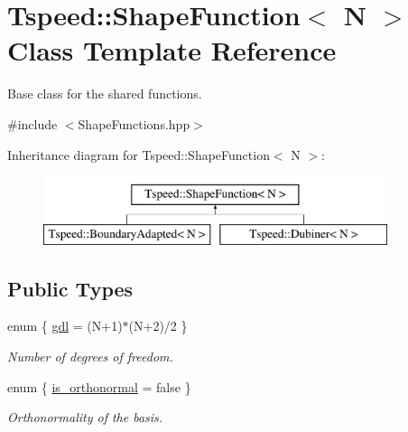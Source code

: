 \hypertarget{classTspeed_1_1ShapeFunction}{\section{Tspeed\-:\-:Shape\-Function$<$ N $>$ Class Template Reference}
\label{classTspeed_1_1ShapeFunction}
}


Base class for the shared functions.  




{\ttfamily \#include $<$Shape\-Functions.\-hpp$>$}

Inheritance diagram for Tspeed\-:\-:Shape\-Function$<$ N $>$\-:\begin{figure}[H]
\begin{center}
\leavevmode
\includegraphics[height=2.000000cm]{classTspeed_1_1ShapeFunction}
\end{center}
\end{figure}
\subsection*{Public Types}
\begin{DoxyCompactItemize}
\item 
enum \{ \hyperlink{classTspeed_1_1ShapeFunction_aae4b82bb304115736483f3549b135662a5000f7869288e4deef5af90732ca04fc}{gdl} = (N+1)$\ast$(N+2)/2
 \}
\begin{DoxyCompactList}\small\item\em Number of degrees of freedom. \end{DoxyCompactList}\item 
enum \{ \hyperlink{classTspeed_1_1ShapeFunction_ab93d04cd0692e117dffed761620d57c1a62f499700236320c9364d9c4bc9ab564}{is\-\_\-orthonormal} = false
 \}
\begin{DoxyCompactList}\small\item\em Orthonormality of the basis. \end{DoxyCompactList}\end{DoxyCompactItemize}
